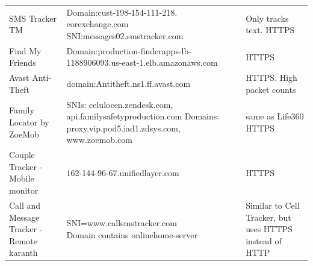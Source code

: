 \documentclass[acmtog]{acmart}
\begin{document}
\begin{table}
\begin{tabular}{p{5cm}p{5cm}p{5cm}}
	SMS Tracker TM & \makecell{Domain:cust-198-154-111-218.\\corexchange.com \\ SNI:messages02.smstracker.com} & Only tracks text. HTTPS \\
	
	Find My Friends & Domain:production-finderapps-lb-1188906093.us-east-1.elb.amazonaws.com & HTTPS\\
	
	Avast Anti-Theft & domain:Antitheft.ns1.ff.avast.com& HTTPS. High packet counts\\
	
	Family Locator by ZoeMob & SNIs: celulocen.zendesk.com, api.familysafetyproduction.com
	Domains: proxy.vip.pod5.iad1.zdsys.com, www.zoemob.com & same as Life360
	HTTPS \\
	
	Couple Tracker -Mobile monitor & 162-144-96-67.unifiedlayer.com & HTTPS \\
	
	Call and Message Tracker -Remote karanth & \makecell{SNI=www.callsmstracker.com
	\\Domain contains onlinehome-server} & Similar to Cell Tracker, but uses HTTPS instead of HTTP \\
	

	
\end{tabular}
\end{table}
\end{document}
